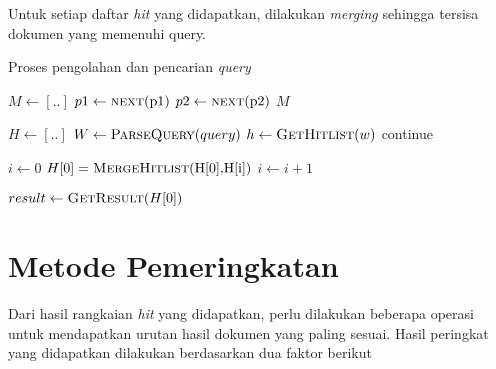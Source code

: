 % 

Untuk setiap daftar \textit{hit} yang didapatkan, dilakukan \textit{merging}
sehingga tersisa dokumen yang memenuhi query.

\begin{algorithm}[H]
  \caption{Proses pengolahan dan pencarian \textit{query}}
  \begin{algorithmic}
    \State $M \gets [..]$
       
         
          \State {}
        \EndIf
      \EndIf
      \State $p1 \gets \Call{next}{$p1$}$
      \State $p2 \gets \Call{next}{$p2$}$
    \EndWhile{}
    \State \Return $M$
    \EndFunction

    \item[] %

    \State $H \gets [..]$
    \State $W \gets \Call{ParseQuery}{query}$ 
      \State $h \gets \Call{GetHitlist}{w}$ 
        \State continue
      \EndIf
      \State {}
    \EndFor

    \item[] %

    \State $i \gets 0$
      \State $H[0] = \Call{MergeHitlist}{$H[0]$, $H[i]$}$
      \State $i \gets i + 1$
    \EndWhile

    \item[] %

    \State $result \gets \Call{GetResult}{H[0]}$
  \end{algorithmic}
\end{algorithm}

\section{Metode Pemeringkatan}

Dari hasil rangkaian \textit{hit} yang didapatkan, perlu dilakukan beberapa
operasi untuk mendapatkan urutan hasil dokumen yang paling sesuai. Hasil
peringkat yang didapatkan dilakukan berdasarkan dua faktor berikut

